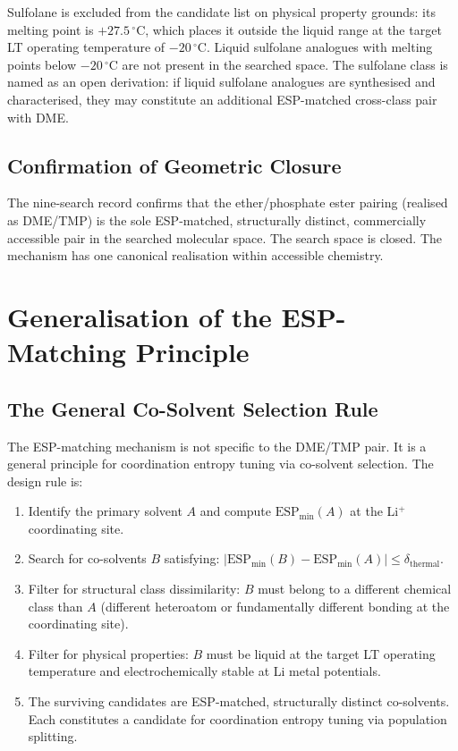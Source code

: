 \documentclass[11pt]{article}
\theoremstyle{plain}
\theoremstyle{definition}
\theoremstyle{remark}
\begin{document}
Sulfolane is excluded from the candidate list on physical property grounds:
its melting point is $+27.5\,^\circ$C, which places it outside the liquid
range at the target LT operating temperature of $-20\,^\circ$C.  Liquid
sulfolane analogues with melting points below $-20\,^\circ$C are not
present in the searched space.  The sulfolane class is named as an open
derivation: if liquid sulfolane analogues are synthesised and characterised,
they may constitute an additional ESP-matched cross-class pair with DME.

\subsection{Confirmation of Geometric Closure}

The nine-search record confirms that the ether/phosphate ester pairing
(realised as DME/TMP) is the sole ESP-matched, structurally distinct,
commercially accessible pair in the searched molecular space.  The search
space is closed.  The mechanism has one canonical realisation within
accessible chemistry.

\section{Generalisation of the ESP-Matching Principle}
\label{sec:generalisation}

\subsection{The General Co-Solvent Selection Rule}

The ESP-matching mechanism is not specific to the DME/TMP pair.  It is a
general principle for coordination entropy tuning via co-solvent selection.
The design rule is:

\begin{enumerate}[leftmargin=2em]
  \item Identify the primary solvent $A$ and compute $\mathrm{ESP}_{\min}(A)$
        at the Li$^+$ coordinating site.
  \item Search for co-solvents $B$ satisfying:
        $|\mathrm{ESP}_{\min}(B) - \mathrm{ESP}_{\min}(A)| \leq
        \delta_{\mathrm{thermal}}$.
  \item Filter for structural class dissimilarity: $B$ must belong to a
        different chemical class than $A$ (different heteroatom or
        fundamentally different bonding at the coordinating site).
  \item Filter for physical properties: $B$ must be liquid at the target
        LT operating temperature and electrochemically stable at Li metal
        potentials.
  \item The surviving candidates are ESP-matched, structurally distinct
        co-solvents.  Each constitutes a candidate for coordination entropy
        tuning via population splitting.
\end{enumerate}
\end{document}
